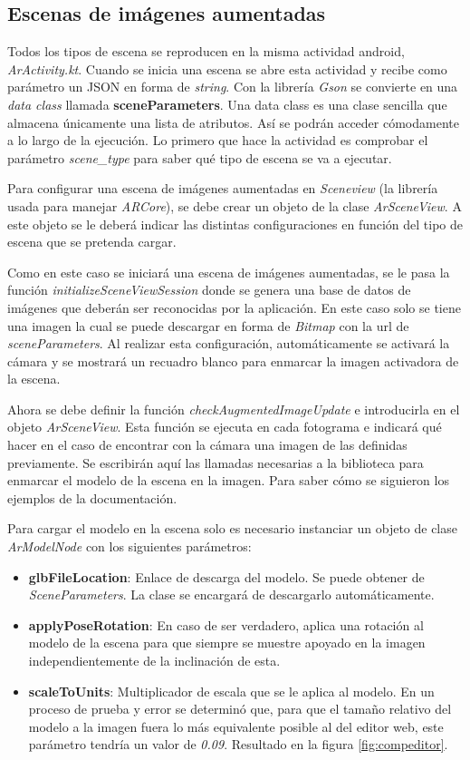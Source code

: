 \subsection{Escenas de imágenes aumentadas}

Todos los tipos de escena se reproducen en la misma actividad android, \textit{ArActivity.kt}. Cuando se inicia una escena se abre esta actividad y recibe como parámetro un JSON en forma de \textit{string}. Con la librería \textit{Gson}\cite{gson} se convierte en una \textit{data class} llamada \textbf{sceneParameters}. Una data class es una clase sencilla que almacena únicamente una lista de atributos. Así se podrán acceder cómodamente a lo largo de la ejecución. Lo primero que hace la actividad es comprobar el parámetro \textit{scene\_type} para saber qué tipo de escena se va a ejecutar.

Para configurar una escena de imágenes aumentadas en \textit{Sceneview} (la librería usada para manejar \textit{ARCore}), se debe crear un objeto de la clase \textit{ArSceneView}. A este objeto se le deberá indicar las distintas configuraciones en función del tipo de escena que se pretenda cargar.

Como en este caso se iniciará una escena de imágenes aumentadas, se le pasa la función \textit{initializeSceneViewSession} donde se genera una base de datos de imágenes que deberán ser reconocidas por la aplicación. En este caso solo se tiene una imagen la cual se puede descargar en forma de \textit{Bitmap} con la url de \textit{sceneParameters}. Al realizar esta configuración, automáticamente se activará la cámara y se mostrará un recuadro blanco para enmarcar la imagen activadora de la escena.

Ahora se debe definir la función \textit{checkAugmentedImageUpdate} e introducirla en el objeto \textit{ArSceneView}. Esta función se ejecuta en cada fotograma e indicará qué hacer en el caso de encontrar con la cámara una imagen de las definidas previamente. Se escribirán aquí las llamadas necesarias a la biblioteca para enmarcar el modelo de la escena en la imagen. Para saber cómo se siguieron los ejemplos de la documentación.

Para cargar el modelo en la escena solo es necesario instanciar un objeto de clase \textit{ArModelNode} con los siguientes parámetros:

\begin{itemize}
    \item \textbf{glbFileLocation}: Enlace de descarga del modelo. Se puede obtener de \textit{SceneParameters}. La clase se encargará de descargarlo automáticamente.
    \item \textbf{applyPoseRotation}: En caso de ser verdadero, aplica una rotación al modelo de la escena para que siempre se muestre apoyado en la imagen independientemente de la inclinación de esta.
    \item \textbf{scaleToUnits}: Multiplicador de escala que se le aplica al modelo. En un proceso de prueba y error se determinó que, para que el tamaño relativo del modelo a la imagen fuera lo más equivalente posible al del editor web, este parámetro tendría un valor de \textit{0.09}. Resultado en la figura \ref{fig:compeditor}.
\end{itemize}

